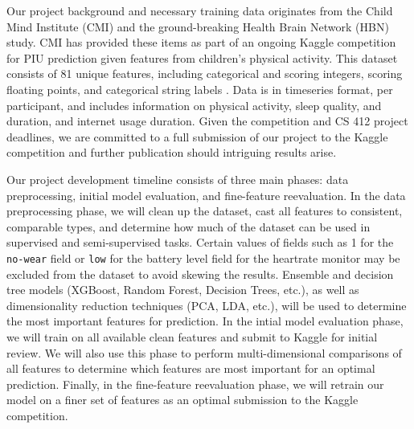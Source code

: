 \documentclass[11pt]{extarticle}
\begin{document}

Our project background and necessary training data originates from the Child Mind Institute (CMI) and the ground-breaking Health Brain Network (HBN) study.
CMI has provided these items as part of an ongoing Kaggle competition for PIU prediction given features from children's physical activity. 
This dataset consists of 81 unique features, including categorical and scoring integers, scoring floating points, and categorical string labels \cite{child-mind-institute-problematic-internet-use}.
Data is in timeseries format, per participant, and includes information on physical activity, sleep quality, and duration, and internet usage duration.
Given the competition and CS 412 project deadlines, we are committed to a full submission of our project to the Kaggle competition and further publication should intriguing results arise.


Our project development timeline consists of three main phases: data preprocessing, initial model evaluation, and fine-feature reevaluation.
In the data preprocessing phase, we will clean up the dataset, cast all features to consistent, comparable types, and determine how much of the dataset can be used in supervised and semi-supervised tasks. Certain values of fields such as 1 for the \texttt{no-wear} field or \texttt{low} for the battery level field for the heartrate monitor may be excluded from the dataset to avoid skewing the results.
Ensemble and decision tree models (XGBoost, Random Forest, Decision Trees, etc.), as well as dimensionality reduction techniques (PCA, LDA, etc.), will be used to determine the most important features for prediction.
In the intial model evaluation phase, we will train on all available clean features and submit to Kaggle for initial review. 
We will also use this phase to perform multi-dimensional comparisons of all features to determine which features are most important for an optimal prediction.
Finally, in the fine-feature reevaluation phase, we will retrain our model on a finer set of features as an optimal submission to the Kaggle competition.



\end{document}
